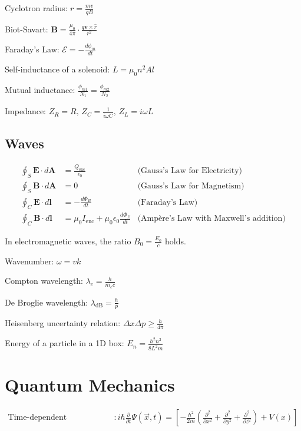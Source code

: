 \documentclass[12pt,a4paper]{article}
\begin{document}
	Cyclotron radius: \( r = \frac{mv}{qB} \)
	
	Biot-Savart: \( \mathbf{B} = \frac{\mu_0}{4 \pi} \cdot \frac{q \mathbf{v} \times \hat{r}}{r^2} \)
	
	Faraday's Law: \( \mathcal{E} = -\frac{d \phi_m}{dt} \)
	
	Self-inductance of a solenoid: \( L = \mu_0 n^2 A l \)
	
	Mutual inductance: \( \frac{\phi_{m1}}{N_1} = \frac{\phi_{m2}}{N_2} \)
	
	Impedance: \( Z_R = R, \, Z_C = \frac{1}{i \omega C}, \, Z_L = i \omega L \)
	
	\subsection*{Waves}
	\begin{align}
		\oint_{S} \mathbf{E} \cdot d\mathbf{A} &= \frac{Q_{\text{enc}}}{\epsilon_0} &\text{(Gauss's Law for Electricity)} \\
		\oint_{S} \mathbf{B} \cdot d\mathbf{A} &= 0 &\text{(Gauss's Law for Magnetism)} \\
		\oint_{C} \mathbf{E} \cdot d\mathbf{l} &= -\frac{d\Phi_{B}}{dt} &\text{(Faraday's Law)} \\
		\oint_{C} \mathbf{B} \cdot d\mathbf{l} &= \mu_0 I_{\text{enc}} + \mu_0 \epsilon_0 \frac{d\Phi_{E}}{dt} &\text{(Ampère's Law with Maxwell's addition)}
	\end{align}
	
	In electromagnetic waves, the ratio \( B_0 = \frac{E_0}{c} \) holds.
	
	Wavenumber: \( \omega = vk \)
	
	Compton wavelength: \( \lambda_c = \frac{h}{m_e c} \)
	
	De Broglie wavelength: \( \lambda_{\text{dB}} = \frac{h}{p} \)
	
	Heisenberg uncertainty relation: \( \Delta x \Delta p \geq \frac{h}{4\pi} \)
	
	Energy of a particle in a 1D box: \( E_n = \frac{h^2 n^2}{8L^2m} \)

	
	\section*{Quantum Mechanics}
	\begin{align*}
		\text{Time-dependent Schrodinger's Equation} & : i\hbar \frac{\partial}{\partial t} \Psi (\vec{x}, t) = [-\frac{\hbar^2}{2m}(\frac{\partial ^2}{\partial x^2} + \frac{\partial ^2}{\partial y ^2} + \frac{\partial^2}{\partial z^2}) + V(x)] \\
	\end{align*}
	
\end{document}

